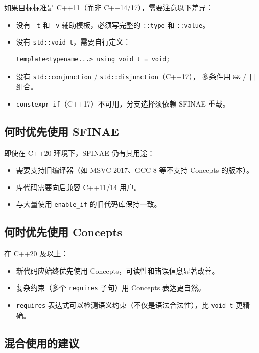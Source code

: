 \documentclass[12pt,a4paper,fontset=fandol]{ctexbook}
\begin{document}
如果目标标准是 C++11（而非 C++14/17），需要注意以下差异：

\begin{itemize}[nosep]
  \item 没有 \texttt{\_t} 和 \texttt{\_v} 辅助模板，必须写完整的 \texttt{::type} 和 \texttt{::value}。
  \item 没有 \texttt{std::void\_t}，需要自行定义：
\begin{lstlisting}[numbers=none]
template<typename...> using void_t = void;
\end{lstlisting}
  \item 没有 \texttt{std::conjunction} / \texttt{std::disjunction}（C++17），
        多条件用 \texttt{\&\&} / \texttt{||} 组合。
  \item \texttt{constexpr if}（C++17）不可用，分支选择须依赖 SFINAE 重载。
\end{itemize}

\subsection{何时优先使用 SFINAE}

即使在 C++20 环境下，SFINAE 仍有其用途：

\begin{itemize}[nosep]
  \item 需要支持旧编译器（如 MSVC 2017、GCC 8 等不支持 Concepts 的版本）。
  \item 库代码需要向后兼容 C++11/14 用户。
  \item 与大量使用 \texttt{enable\_if} 的旧代码库保持一致。
\end{itemize}

\subsection{何时优先使用 Concepts}

在 C++20 及以上：

\begin{itemize}[nosep]
  \item 新代码应始终优先使用 Concepts，可读性和错误信息显著改善。
  \item 复杂约束（多个 \texttt{requires} 子句）用 Concepts 表达更自然。
  \item \texttt{requires} 表达式可以检测语义约束（不仅是语法合法性），比 \texttt{void\_t} 更精确。
\end{itemize}

\subsection{混合使用的建议}
\end{document}
